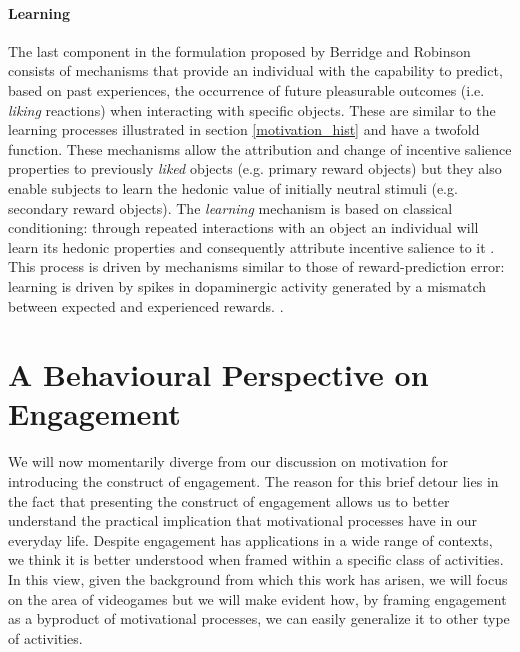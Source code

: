 \paragraph*{Learning}
\label{learning}
The last component in the formulation proposed by Berridge and Robinson \cite{berridge1998role,berridge2004motivation} consists of mechanisms that provide an individual with the capability to predict, based on past experiences, the occurrence of future pleasurable outcomes (i.e. \emph{liking} reactions) when interacting with specific objects. These are similar to the learning processes illustrated in section \ref{motivation_hist} and have a twofold function. These mechanisms allow the attribution and change of incentive salience properties to previously \emph{liked} objects (e.g. primary reward objects) but they also enable subjects to learn the hedonic value of initially neutral stimuli (e.g. secondary reward objects). The \emph{learning} mechanism is based on classical conditioning: through repeated interactions with an object an individual will learn its hedonic properties and consequently attribute incentive salience to it \cite{berridge2004motivation,berridge2009dissecting}. This process is driven by mechanisms similar to those of reward-prediction error: learning is driven by spikes in dopaminergic activity generated by a mismatch between expected and experienced rewards. \cite{schultz1997neural,schultz2000multiple,flagel2011selective}.

\section{A Behavioural Perspective on Engagement}
\label{engagement}
We will now momentarily diverge from our discussion on motivation for introducing the construct of engagement. The reason for this brief detour lies in the fact that presenting the construct of engagement allows us to better understand the practical implication that motivational processes have in our everyday life. Despite engagement has applications in a wide range of contexts, we think it is better understood when framed within a specific class of activities. In this view, given the background from which this work has arisen, we will focus on the area of videogames but we will make evident how, by framing engagement as a byproduct of motivational processes, we can easily generalize it to other type of activities.

